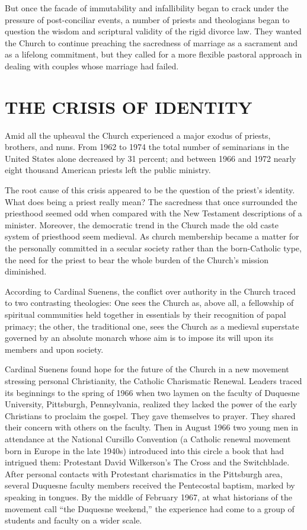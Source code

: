 But once the facade of immutability and infallibility began to crack under the pressure of
post-conciliar events, a number of priests and theologians began to question the wisdom and
scriptural validity of the rigid divorce law. They wanted the Church to continue preaching the
sacredness of marriage as a sacrament and as a lifelong commitment, but they called for a more
flexible pastoral approach in dealing with couples whose marriage had failed.

\section{THE CRISIS OF IDENTITY}

Amid all the upheaval the Church experienced a major exodus of priests, brothers, and nuns. From
1962 to 1974 the total number of seminarians in the United States alone decreased by 31 percent; and
between 1966 and 1972 nearly eight thousand American priests left the public ministry.

The root cause of this crisis appeared to be the question of the priest’s identity. What does being
a priest really mean? The sacredness that once surrounded the priesthood seemed odd when compared
with the New Testament descriptions of a minister. Moreover, the democratic trend in the Church made
the old caste system of priesthood seem medieval. As church membership became a matter for the
personally committed in a secular society rather than the born-Catholic type, the need for the
priest to bear the whole burden of the Church’s mission diminished.

According to Cardinal Suenens, the conflict over authority in the Church traced to two contrasting
theologies: One sees the Church as, above all, a fellowship of spiritual communities held together
in essentials by their recognition of papal primacy; the other, the traditional one, sees the Church
as a medieval superstate governed by an absolute monarch whose aim is to impose its will upon its
members and upon society.

Cardinal Suenens found hope for the future of the Church in a new movement stressing personal
Christianity, the Catholic Charismatic Renewal. Leaders traced its beginnings to the spring of 1966
when two laymen on the faculty of Duquesne University, Pittsburgh, Pennsylvania, realized they
lacked the power of the early Christians to proclaim the gospel. They gave themselves to prayer.
They shared their concern with others on the faculty. Then in August 1966 two young men in
attendance at the National Cursillo Convention (a Catholic renewal movement born in Europe in the
late 1940s) introduced into this circle a book that had intrigued them: Protestant David Wilkerson’s
The Cross and the Switchblade. After personal contacts with Protestant charismatics in the
Pittsburgh area, several Duquesne faculty members received the Pentecostal baptism, marked by
speaking in tongues. By the middle of February 1967, at what historians of the movement call “the
Duquesne weekend,” the experience had come to a group of students and faculty on a wider scale.

